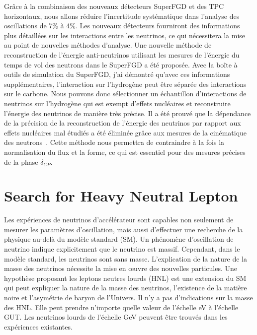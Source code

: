 \documentclass[../main.tex]{subfiles}
\begin{document}
Grâce à la combinaison des nouveaux détecteurs SuperFGD et des TPC horizontaux, nous allons réduire l'incertitude systématique dans l'analyse des oscillations de 7\% à 4\%. Les nouveaux détecteurs fourniront des informations plus détaillées sur les interactions entre les neutrinos, ce qui nécessitera la mise au point de nouvelles méthodes d'analyse. Une nouvelle méthode de reconstruction de l'énergie anti-neutrinos utilisant les mesures de l'énergie du temps de vol des neutrons dans le SuperFGD a été proposée. Avec la boîte à outils de simulation du SuperFGD, j'ai démontré qu'avec ces informations supplémentaires, l'interaction sur l'hydrogène peut être séparée des interactions sur le carbone. Nous pouvons donc sélectionner un échantillon d'interactions de neutrinos sur l'hydrogène qui est exempt d'effets nucléaires et reconstruire l'énergie des neutrinos de manière très précise. Il a été prouvé que la dépendance de la précision de la reconstruction de l'énergie des neutrinos par rapport aux effets nucléaires mal étudiés a été éliminée grâce aux mesures de la cinématique des neutrons~\cite{Munteanu2019}. Cette méthode nous permettra de contraindre à la fois la normalisation du flux et la forme, ce qui est essentiel pour des mesures précises de la phase $\delta_{CP}$.

\vspace{1cm}

\setcounter{section}{2}
\section*{Search for Heavy Neutral Lepton}

Les expériences de neutrinos d'accélérateur sont capables non seulement de mesurer les paramètres d'oscillation, mais aussi d'effectuer une recherche de la physique au-delà du modèle standard (SM). Un phénomène d'oscillation de neutrino indique explicitement que le neutrino est massif. Cependant, dans le modèle standard, les neutrinos sont sans masse. L'explication de la nature de la masse des neutrinos nécessite la mise en œuvre des nouvelles particules. Une hypothèse proposant les leptons neutres lourds (HNL) est une extension du SM qui peut expliquer la nature de la masse des neutrinos, l'existence de la matière noire et l'asymétrie de baryon de l'Univers. Il n'y a pas d'indications sur la masse des HNL. Elle peut prendre n'importe quelle valeur de l'échelle eV à l'échelle GUT. Les neutrinos lourds de l'échelle GeV peuvent être trouvés dans les expériences existantes.
\end{document}

